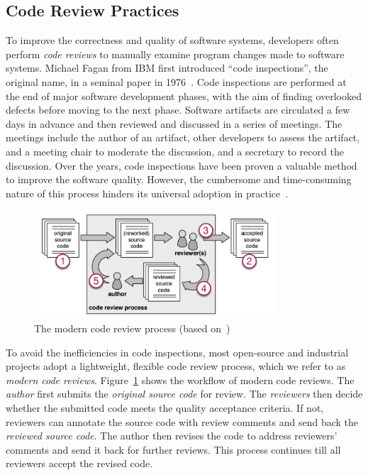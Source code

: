 \documentclass[runningheads,a4paper]{llncs}
\begin{document}
\subsection{Code Review Practices}
To improve the correctness and quality of software systems, developers often perform {\em code reviews} to manually examine program changes made to software systems. Michael Fagan from IBM first introduced ``code inspections'', the original name, in a seminal paper in 1976~\cite{fagan2001design}. Code inspections are performed at the end of major software development phases, with the aim of finding overlooked defects before moving to the next phase. Software artifacts are circulated a few days in advance and then reviewed and discussed in a series of meetings. The meetings include the author of an artifact, other developers to assess the artifact, and a meeting chair to moderate the discussion, and a secretary to record the discussion. Over the years, code inspections have been proven a valuable method to improve the software quality. However, the cumbersome and time-consuming nature of this process hinders its universal adoption in practice~\cite{johnson1998reengineering}. 

\begin{figure}[ht]
 \centering
 \includegraphics[width=0.8\textwidth]{images/review-process.png}
 \caption{The modern code review process (based on~\cite{beller2014modern})}
 \label{fig:review-process}
\end{figure}

To avoid the inefficiencies in code inspections, most open-source and industrial projects adopt a lightweight, flexible code review process, which we refer to as {\em modern code reviews}. Figure~\ref{fig:review-process} shows the workflow of modern code reviews. The {\em author} first submits the {\em original source code} for review. The {\em reviewers} then decide whether the submitted code meets the quality acceptance criteria. If not, reviewers can annotate the source code with review comments and send back the {\em reviewed source code}. The author then revises the code to address reviewers' comments and send it back for further reviews. This process continues till all reviewers accept the revised code.
\end{document}
